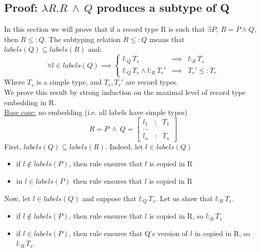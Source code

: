 \documentclass[11pt]{article}
\begin{document}
\begin{appendices}
			\subsection{Proof: $\lambda R. R \ \boxed{\wedge} \ Q$ produces a subtype of Q}
				In this section we will prove that if a record type R is such that $\exists P, \ R = P \boxed{\wedge} Q$, then $R \leq : Q$. The subtyping relation $R \leq : Q$ means that $labels(Q) \subseteq labels(R)$ and:
				\begin{equation*}
					\forall l \in labels(Q)
					\implies
					\left\lbrace\begin{array}{lll}
						l :_{Q} T_{s} &\implies& l :_{R} T_{s}\\
						l :_Q T_{r} \wedge l :_R T_r'&\implies& T_r' \leq: T_r
					\end{array}\right.
				\end{equation*}
				Where $T_s$ is a simple type, and $T_r, T_r'$ are record types.\\
				We prove this result by strong induction on the maximal level of record type embedding in R.\\
				\underline{Base case:} no embedding (i.e. all labels have simple types)
				\begin{equation*}
					R = P \ \boxed{\wedge} \ Q = \left[\begin{array}{lll}
						l_1 &:& T_1\\
						\dots\\
						l_n &:& T_n
					\end{array}\right]
				\end{equation*}
				First, $labels(Q) \subseteq labels(R)$. Indeed, let $l \in labels(Q)$
				\begin{itemize}
					\item if $l \notin labels(P)$, then rule  ensures that $l$ is copied in R
					\item in $l \in labels(P)$ then rule  ensures that $l$ is copied in R
				\end{itemize}
				Now, let $l \in labels(Q)$ and suppose that $l :_{Q} T_s$. Let us show that $l :_{R} T_s$.
				\begin{itemize}
					\item if $l \notin labels(P)$, then rule  ensures that $l$ is copied in R, so $l :_{R} T_s$
					\item if $l \in labels(P)$, then rule  ensures that Q's version of $l$ in copied in R, so $l :_R T_s$.
				\end{itemize}

\end{appendices}
\end{document}
